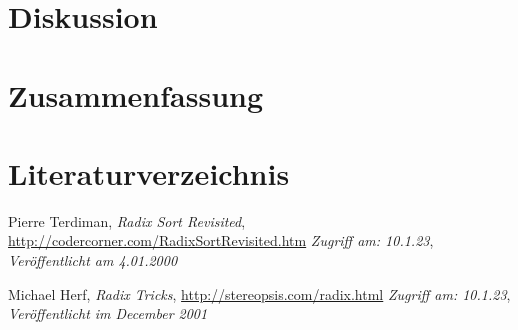 \documentclass[12pt,a4paper]{article}
\begin{document}
\section*{Diskussion}
\clearpage
\section*{Zusammenfassung}
\clearpage
\section*{Literaturverzeichnis}

\begin{thebibliography}{10}
        Pierre Terdiman,
        \textit{Radix Sort Revisited},
        \url{http://codercorner.com/RadixSortRevisited.htm}
        \textit{Zugriff am: 10.1.23},
        \textit{Veröffentlicht am 4.01.2000}
    
        Michael Herf,
        \textit{Radix Tricks},
        \url{http://stereopsis.com/radix.html}
        \textit{Zugriff am: 10.1.23},
        \textit{Veröffentlicht im December 2001}

\end{thebibliography}
\end{document}
